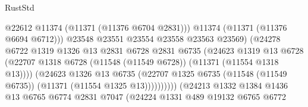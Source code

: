 \begin{lexlean}{RustStd}
\begin{coremodule}
                                              @22612
                                              @11374
                                              (@11371 (@11376 @6704 @2831)))
                                            @11374
                                            (@11371 (@11376 @6694 @6712)))
                                          @23548
                                          @23551
                                          @23554
                                          @23558
                                          @23563
                                          @23569)
                                        (@24278
                                          @6722
                                          @1319
                                          @1326
                                          @13
                                          @2831
                                          @6728
                                          @2831
                                          @6735
                                          (@24623
                                            @1319
                                            @13
                                            @6728
                                            (@22707
                                              @1318
                                              @6728
                                              (@11548 (@11549 @6728))
                                              (@11371 (@11554 @1318 @13))))
                                          (@24623
                                            @1326
                                            @13
                                            @6735
                                            (@22707
                                              @1325
                                              @6735
                                              (@11548 (@11549 @6735))
                                              (@11371 (@11554 @1325 @13))))))))))
                              (@24213
                                @1332
                                @1384
                                @1436
                                @13
                                @6765
                                @6774
                                @2831
                                @7047
                                (@24224
                                  @1331
                                  @489
                                  @19132
                                  @6765
                                  @6772

\end{coremodule}
\end{lexlean}
